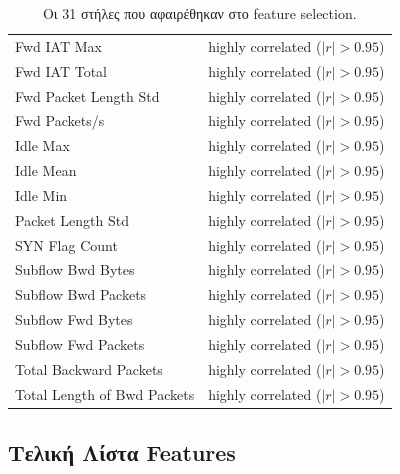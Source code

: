 \documentclass[12pt,a4paper,twoside]{book}
\begin{document}
\begin{table}[H]
\begin{tabular}{p{4.5cm}p{7.5cm}}
        Fwd IAT Max                     & highly correlated (\(|r|>0.95\))                                \\
        Fwd IAT Total                   & highly correlated (\(|r|>0.95\))                                \\
        Fwd Packet Length Std           & highly correlated (\(|r|>0.95\))                                \\
        Fwd Packets/s                   & highly correlated (\(|r|>0.95\))                                \\
        Idle Max                        & highly correlated (\(|r|>0.95\))                                \\
        Idle Mean                       & highly correlated (\(|r|>0.95\))                                \\
        Idle Min                        & highly correlated (\(|r|>0.95\))                                \\
        Packet Length Std               & highly correlated (\(|r|>0.95\))                                \\
        SYN Flag Count                  & highly correlated (\(|r|>0.95\))                                \\
        Subflow Bwd Bytes               & highly correlated (\(|r|>0.95\))                                \\
        Subflow Bwd Packets             & highly correlated (\(|r|>0.95\))                                \\
        Subflow Fwd Bytes               & highly correlated (\(|r|>0.95\))                                \\
        Subflow Fwd Packets             & highly correlated (\(|r|>0.95\))                                \\
        Total Backward Packets          & highly correlated (\(|r|>0.95\))                                \\
        Total Length of Bwd Packets     & highly correlated (\(|r|>0.95\))                                \\
        \bottomrule
    \end{tabular}
    \caption{Οι 31 στήλες που αφαιρέθηκαν στο feature
    selection.}\label{tab:removed_features}
\end{table}

\subsection{Τελική Λίστα Features}
\end{document}
